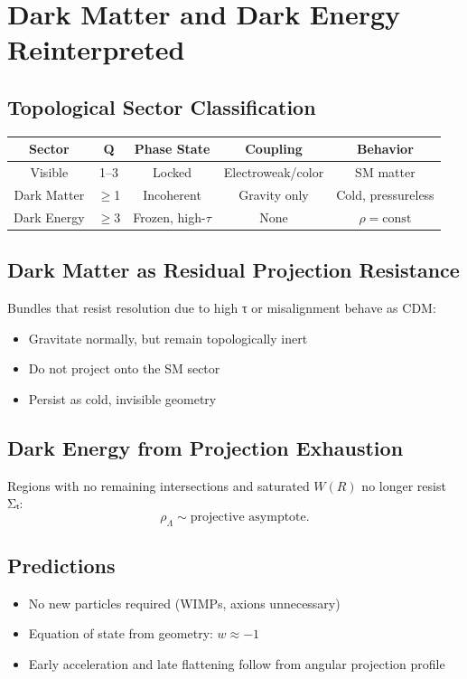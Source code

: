 \section{Dark Matter and Dark Energy Reinterpreted}

\subsection{Topological Sector Classification}
\begin{center}
\begin{tabular}{|c|c|c|c|c|}
\hline
Sector & Q & Phase State & Coupling & Behavior \\\hline
Visible & 1--3 & Locked & Electroweak/color & SM matter \\
Dark Matter & $\geq$1 & Incoherent & Gravity only & Cold, pressureless \\
Dark Energy & $\geq$3 & Frozen, high-$\tau$ & None & $\rho=\text{const}$ \\\hline
\end{tabular}
\end{center}

\subsection{Dark Matter as Residual Projection Resistance}
Bundles that resist resolution due to high τ or misalignment behave as CDM:
\begin{itemize}
  \item Gravitate normally, but remain topologically inert
  \item Do not project onto the SM sector
  \item Persist as cold, invisible geometry
\end{itemize}

\subsection{Dark Energy from Projection Exhaustion}
Regions with no remaining intersections and saturated $W(R)$ no longer resist Σₜ:
\[
\rho_\Lambda \sim \text{projective asymptote}.
\]

\subsection{Predictions}
\begin{itemize}
  \item No new particles required (WIMPs, axions unnecessary)
  \item Equation of state from geometry: $w \approx -1$
  \item Early acceleration and late flattening follow from angular projection profile
\end{itemize}


